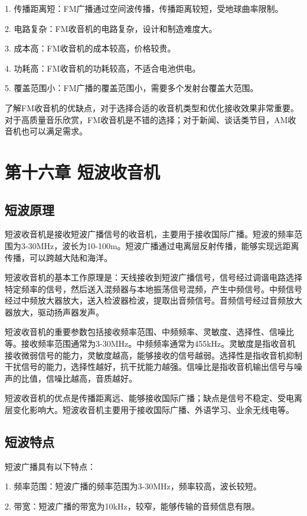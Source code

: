 \documentclass[12pt,UTF8]{ctexbook}
\begin{document}
1. 传播距离短：FM广播通过空间波传播，传播距离较短，受地球曲率限制。

2. 电路复杂：FM收音机的电路复杂，设计和制造难度大。

3. 成本高：FM收音机的成本较高，价格较贵。

4. 功耗高：FM收音机的功耗较高，不适合电池供电。

5. 覆盖范围小：FM广播的覆盖范围小，需要多个发射台覆盖大范围。

了解FM收音机的优缺点，对于选择合适的收音机类型和优化接收效果非常重要。对于高质量音乐欣赏，FM收音机是不错的选择；对于新闻、谈话类节目，AM收音机也可以满足需求。

\chapter{第十六章 短波收音机}

\section{短波原理}

短波收音机是接收短波广播信号的收音机，主要用于接收国际广播。短波的频率范围为3-30MHz，波长为10-100m。短波广播通过电离层反射传播，能够实现远距离传播，可以跨越大陆和海洋。

短波收音机的基本工作原理是：天线接收到短波广播信号，信号经过调谐电路选择特定频率的信号，然后送入混频器与本地振荡信号混频，产生中频信号。中频信号经过中频放大器放大，送入检波器检波，提取出音频信号。音频信号经过音频放大器放大，驱动扬声器发声。

短波收音机的重要参数包括接收频率范围、中频频率、灵敏度、选择性、信噪比等。接收频率范围通常为3-30MHz。中频频率通常为455kHz。灵敏度是指收音机接收微弱信号的能力，灵敏度越高，能够接收的信号越弱。选择性是指收音机抑制干扰信号的能力，选择性越好，抗干扰能力越强。信噪比是指收音机输出信号与噪声的比值，信噪比越高，音质越好。

短波收音机的优点是传播距离远、能够接收国际广播；缺点是信号不稳定、受电离层变化影响大。短波收音机主要用于接收国际广播、外语学习、业余无线电等。

\section{短波特点}

短波广播具有以下特点：

1. 频率范围：短波广播的频率范围为3-30MHz，频率较高，波长较短。

2. 带宽：短波广播的带宽为10kHz，较窄，能够传输的音频信息有限。
\end{document}
